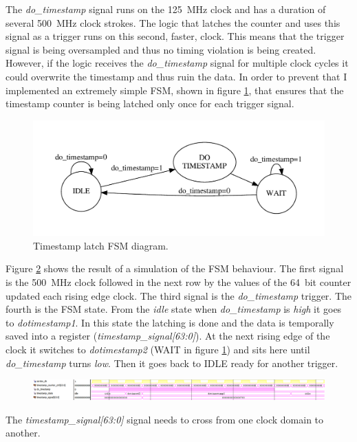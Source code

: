 The \textit{do\_timestamp} signal runs on the 125~MHz clock and has a duration of several 500~MHz clock strokes. The logic that latches the counter and uses this signal as a trigger runs on this second, faster, clock.
This means that the trigger signal is being oversampled and thus no timing violation is being created.
However, if the logic receives the \textit{do\_timestamp} signal for multiple clock cycles it could overwrite the timestamp and thus ruin the data.
In order to prevent that I implemented an extremely simple FSM, shown in figure \ref{fig:timestampFSM}, that ensures that the timestamp counter is being latched only once for each trigger signal.
\begin{figure}[H]
	\centering
	\includegraphics[width=0.85\linewidth]{FSMdiagrams/timestampFSM.pdf}
	\caption{Timestamp latch FSM diagram.}
	\label{fig:timestampFSM}
\end{figure}
\noindent Figure \ref{fig:timestampfsm} shows the result of a simulation of the FSM behaviour.
The first signal is the 500~MHz clock followed in the next row by the values of the 64~bit counter updated each rising edge clock. The third signal is the \textit{do\_timestamp} trigger. The fourth is the FSM state.
From the \textit{idle} state when \textit{do\_timestamp} is \textit{high} it goes to \textit{dotimestamp1}. In this state the latching is done and the data is temporally saved into a register (\textit{timestamp\_signal[63:0]}). At the next rising edge of the clock it switches to \textit{dotimestamp2} (WAIT in figure \ref{fig:timestampFSM}) and sits here until \textit{do\_timestamp} turns \textit{low}. Then it goes back to IDLE ready for another trigger.
\begin{figure}[H]
	\centering
	\includegraphics[width=1.0\linewidth]{IMG/ch4/TIMESTAMPsimulations/TIMESTAMPFSM}
	\caption{}
	\label{fig:timestampfsm}
\end{figure}
\noindent The \textit{timestamp\_signal[63:0]} signal needs to cross from one clock domain to another.
